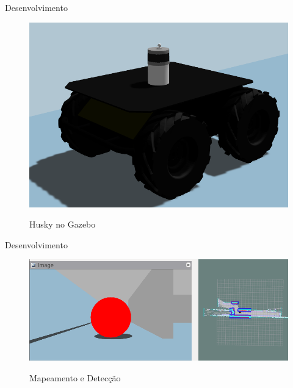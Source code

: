 \documentclass{beamer}
\begin{document}
            \begin{frame}{Desenvolvimento}
                \begin{figure}[htb]
                    \centering
                    \includegraphics[scale=0.35]{figuras/husky.png}                   
                    \label{}
                    \caption{Husky no Gazebo}
                \end{figure}

            \end{frame}

            \begin{frame}{Desenvolvimento}
                \centering              
                    \begin{figure}[htb]
                        \centering
                        \includegraphics[scale=0.35]{figuras/detection_and_mapping.png}                   
                        \label{}
                        \caption{Mapeamento e Detecção}
                    \end{figure} 
            \end{frame}
\end{document}
